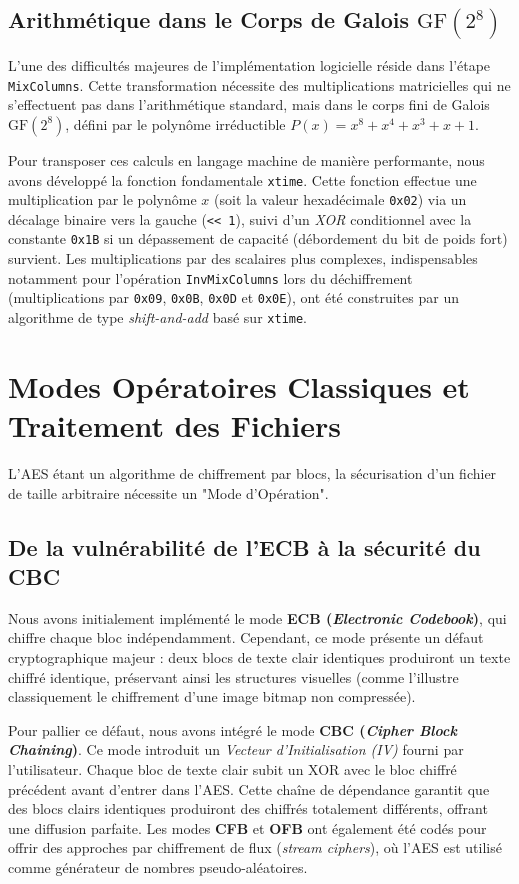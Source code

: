 \documentclass[12pt,a4paper]{article}
\begin{document}
\subsection{Arithmétique dans le Corps de Galois $\mathrm{GF}(2^8)$}
L'une des difficultés majeures de l'implémentation logicielle réside dans l'étape \texttt{MixColumns}. Cette transformation nécessite des multiplications matricielles qui ne s'effectuent pas dans l'arithmétique standard, mais dans le corps fini de Galois $\mathrm{GF}(2^8)$, défini par le polynôme irréductible $P(x) = x^8 + x^4 + x^3 + x + 1$.

Pour transposer ces calculs en langage machine de manière performante, nous avons développé la fonction fondamentale \texttt{xtime}. Cette fonction effectue une multiplication par le polynôme $x$ (soit la valeur hexadécimale \texttt{0x02}) via un décalage binaire vers la gauche (\verb|<< 1|), suivi d'un \textit{XOR} conditionnel avec la constante \texttt{0x1B} si un dépassement de capacité (débordement du bit de poids fort) survient. Les multiplications par des scalaires plus complexes, indispensables notamment pour l'opération \texttt{InvMixColumns} lors du déchiffrement (multiplications par \texttt{0x09}, \texttt{0x0B}, \texttt{0x0D} et \texttt{0x0E}), ont été construites par un algorithme de type \textit{shift-and-add} basé sur \texttt{xtime}.

\section{Modes Opératoires Classiques et Traitement des Fichiers}

L'AES étant un algorithme de chiffrement par blocs, la sécurisation d'un fichier de taille arbitraire nécessite un "Mode d'Opération".

\subsection{De la vulnérabilité de l'ECB à la sécurité du CBC}
Nous avons initialement implémenté le mode \textbf{ECB (\textit{Electronic Codebook})}, qui chiffre chaque bloc indépendamment. Cependant, ce mode présente un défaut cryptographique majeur : deux blocs de texte clair identiques produiront un texte chiffré identique, préservant ainsi les structures visuelles (comme l'illustre classiquement le chiffrement d'une image bitmap non compressée).

Pour pallier ce défaut, nous avons intégré le mode \textbf{CBC (\textit{Cipher Block Chaining})}. Ce mode introduit un \textit{Vecteur d'Initialisation (IV)} fourni par l'utilisateur. Chaque bloc de texte clair subit un XOR avec le bloc chiffré précédent avant d'entrer dans l'AES. Cette chaîne de dépendance garantit que des blocs clairs identiques produiront des chiffrés totalement différents, offrant une diffusion parfaite. Les modes \textbf{CFB} et \textbf{OFB} ont également été codés pour offrir des approches par chiffrement de flux (\textit{stream ciphers}), où l'AES est utilisé comme générateur de nombres pseudo-aléatoires.
\end{document}
